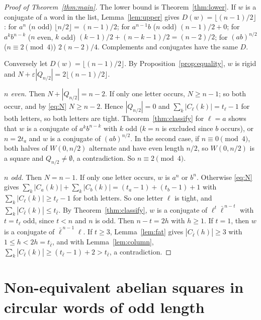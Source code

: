 \documentclass[11pt,reqno]{amsart}
\theoremstyle{definition}
\newcommand{\lb}{\bar\ell}
\newcommand{\fl}[1]{\lfloor #1\rfloor}
\begin{document}
\begin{proof}[Proof of Theorem~\ref{thm:main}]
The lower bound is Theorem~\ref{thm:lower}. If $w$ is a conjugate of a word in the list, Lemma~\ref{lem:upper} gives $D(w)=\fl{(n-1)/2}$: for $a^n$ ($n$ odd) $\fl{n/2}=(n-1)/2$; for $a^{n-1}b$ ($n$ odd) $(n-1)/2+0$; for $a^kb^{n-k}$ ($n$ even, $k$ odd) $(k-1)/2+(n-k-1)/2=(n-2)/2$; for $(ab)^{n/2}$ ($n\equiv 2\pmod 4$) $2(n-2)/4$. Complements and conjugates have the same $D$.

Conversely let $D(w)=\fl{(n-1)/2}$. By Proposition~\ref{prop:equality}, $w$ is rigid and $N+\varepsilon|Q_{n/2}|=2\fl{(n-1)/2}$.

\emph{$n$ even.} Then $N+|Q_{n/2}|=n-2$. If only one letter occurs, $N\ge n-1$; so both occur, and by \eqref{eq:N} $N\ge n-2$. Hence $|Q_{n/2}|=0$ and $\sum_k|C_\ell(k)|=t_\ell-1$ for both letters, so both letters are tight. Theorem~\ref{thm:classify} for $\ell=a$ shows that $w$ is a conjugate of $a^kb^{n-k}$ with $k$ odd ($k=n$ is excluded since $b$ occurs), or $n=2t_a$ and $w$ is a conjugate of $(ab)^{n/2}$. In the second case, if $n\equiv 0\pmod 4$, both halves of $W(0,n/2)$ alternate and have even length $n/2$, so $W(0,n/2)$ is a square and $Q_{n/2}\ne\emptyset$, a contradiction. So $n\equiv 2\pmod 4$.

\emph{$n$ odd.} Then $N=n-1$. If only one letter occurs, $w$ is $a^n$ or $b^n$. Otherwise \eqref{eq:N} gives $\sum_k|C_a(k)|+\sum_k|C_b(k)|=(t_a-1)+(t_b-1)+1$ with $\sum_k|C_\ell(k)|\ge t_\ell-1$ for both letters. So one letter $\ell$ is tight, and $\sum_k|C_{\lb}(k)|\le t_{\lb}$. By Theorem~\ref{thm:classify}, $w$ is a conjugate of $\ell^t\lb^{\,n-t}$ with $t=t_\ell$ odd, since $t<n$ and $n$ is odd. Then $n-t=2h$ with $h\ge 1$. If $t=1$, then $w$ is a conjugate of $\lb^{\,n-1}\ell$. If $t\ge 3$, Lemma~\ref{lem:fat} gives $|C_{\lb}(h)|\ge 3$ with $1\le h<2h=t_{\lb}$, and with Lemma~\ref{lem:column}, $\sum_k|C_{\lb}(k)|\ge(t_{\lb}-1)+2>t_{\lb}$, a contradiction.
\end{proof}

\section{Non-equivalent abelian squares in circular words of odd length}\label{sec:types}
\end{document}
